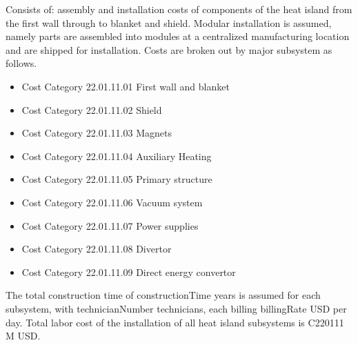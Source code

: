 
Consists of: assembly and installation costs of components of the heat island from the first wall through to blanket and shield. Modular installation is assumed, namely parts are assembled into modules at a centralized manufacturing location and are shipped for installation. Costs are broken out by major subsystem as follows.

\begin{itemize}
    \item Cost Category 22.01.11.01 First wall and blanket
    \item Cost Category 22.01.11.02 Shield
    \item Cost Category 22.01.11.03 Magnets
    \item Cost Category 22.01.11.04 Auxiliary Heating
    \item Cost Category 22.01.11.05 Primary structure
    \item Cost Category 22.01.11.06 Vacuum system
    \item Cost Category 22.01.11.07 Power supplies
    \item Cost Category 22.01.11.08 Divertor
    \item Cost Category 22.01.11.09 Direct energy convertor
\end{itemize}

The total construction time of constructionTime years is assumed for each subsystem, with technicianNumber technicians, each billing billingRate USD per day.  Total labor cost of the installation of all heat island subsystems is C220111 M USD.